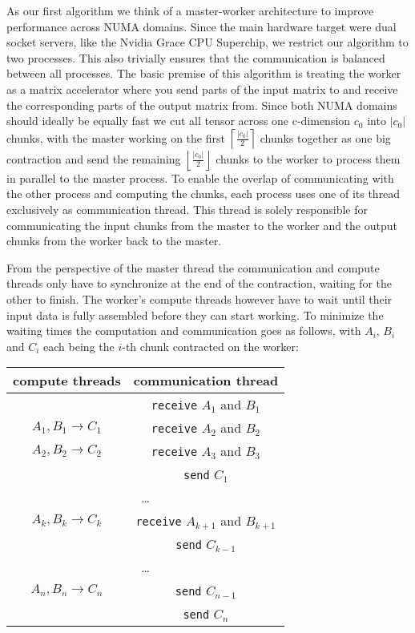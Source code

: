As our first algorithm we think of a master-worker architecture to improve performance across NUMA domains.
Since the main hardware target were dual socket servers, like the Nvidia Grace CPU Superchip, we restrict our algorithm to two processes.
This also trivially ensures that the communication is balanced between all processes.
The basic premise of this algorithm is treating the worker as a matrix accelerator where you send parts of the input matrix to and receive the corresponding parts of the output matrix from.
Since both NUMA domains should ideally be equally fast we cut all tensor across one c-dimension $c_0$ into $|c_0|$ chunks, with the master working on the first $\left \lceil{\frac{|c_0|}{2}}\right \rceil $ chunks together as one big contraction and send  the remaining  $\left \lfloor{\frac{|c_0|}{2}}\right \rfloor$ chunks to the worker to process them in parallel to the master process.
To enable the overlap of communicating with the other process and computing the chunks, each process uses one of its thread exclusively as communication thread.
This thread is solely responsible for communicating the input chunks from the master to the worker and the output chunks from the worker back to the master.

From the perspective of the master thread the communication and compute threads only have to synchronize at the end of the contraction, waiting for the other to finish.
The worker's compute threads however have to wait until their input data is fully assembled before they can start working.
To minimize the waiting times the computation and communication goes as follows, with $A_i$, $B_i$ and $C_i$ each being the $i$-th chunk contracted on the worker:

\begin{center}
  \begin{tabular}{ |c|c| } 
  \hline
  compute threads & communication thread\\
  \hline
   & \texttt{receive} $A_1$ and $B_1$\\
  \hline
  $A_1,B_1 \rightarrow C_1$ & \texttt{receive} $A_2$ and $B_2$\\
  \hline
  $A_2,B_2 \rightarrow C_2$ & \texttt{receive} $A_3$ and $B_3$\\
  & \texttt{send} $C_1$\\
  \hline
  \multicolumn{2}{|c|}{\dots}\\
  \hline
  $A_k,B_k \rightarrow C_k$ & \texttt{receive} $A_{k+1}$ and $B_{k+1}$\\
  & \texttt{send} $C_{k-1}$\\
  \hline
  \multicolumn{2}{|c|}{\dots}\\
  \hline
  $A_n,B_n \rightarrow C_n$ & \texttt{send} $C_{n-1}$\\
  \hline
  & \texttt{send} $C_n$\\
  \hline
\end{tabular}
\end{center}

